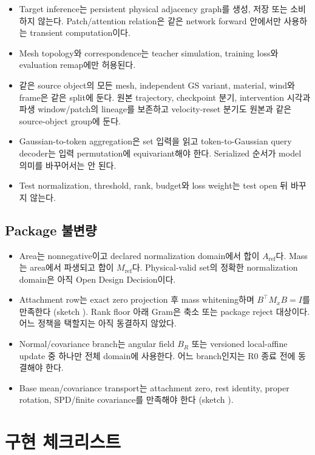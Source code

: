 \documentclass[10pt]{article}
\begin{document}
\begin{itemize}
  \item Target inference는 persistent physical adjacency graph를 생성, 저장 또는 소비하지 않는다.
  Patch/attention relation은 같은 network forward 안에서만 사용하는 transient computation이다.
  \item Mesh topology와 correspondence는 teacher simulation, training loss와 evaluation remap에만 허용된다.
  \item 같은 source object의 모든 mesh, independent GS variant, material, wind와 frame은 같은 split에 둔다.
  원본 trajectory, checkpoint 분기, intervention 시각과 파생 window/patch의 lineage를 보존하고
  velocity-reset 분기도 원본과 같은 source-object group에 둔다.
  \item Gaussian-to-token aggregation은 set 입력을 읽고 token-to-Gaussian query decoder는 입력 permutation에
  equivariant해야 한다. Serialized 순서가 model 의미를 바꾸어서는 안 된다.
  \item Test normalization, threshold, rank, budget와 loss weight는 test open 뒤 바꾸지 않는다.
\end{itemize}

\subsection{Package 불변량}

\begin{itemize}
  \item Area는 nonnegative이고 declared normalization domain에서 합이 \(A_{\mathrm{ref}}\)다.
  Mass는 area에서 파생되고 합이 \(M_{\mathrm{ref}}\)다. Physical-valid set의 정확한 normalization domain은
  아직 Open Design Decision이다.
  \item Attachment row는 exact zero projection 후 mass whitening하며 \(B^\top M_xB=I\)를 만족한다
  (sketch ). Rank floor 아래 Gram은 축소 또는 package reject 대상이다.
  어느 정책을 택할지는 아직 동결하지 않았다.
  \item Normal/covariance branch는 angular field \(B_R\) 또는 versioned local-affine update 중 하나만
  전체 domain에 사용한다. 어느 branch인지는 R0 종료 전에 동결해야 한다.
  \item Base mean/covariance transport는 attachment zero, rest identity, proper rotation, SPD/finite covariance를
  만족해야 한다 (sketch ).
\end{itemize}

\section{구현 체크리스트}
\label{sec:r0-chapter-4}
\end{document}
